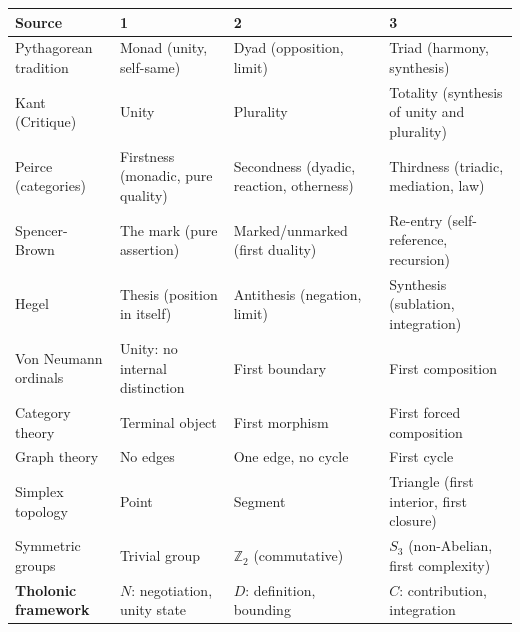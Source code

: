 \documentclass[
  11pt,
  letterpaper,
]{article}
\begin{document}
\begin{longtable}[]{@{}
  >{\raggedright\arraybackslash}p{}
  >{\raggedright\arraybackslash}p{}
  >{\raggedright\arraybackslash}p{}
  >{\raggedright\arraybackslash}p{}@{}}
\toprule\noalign{}
\begin{minipage}[b]{\linewidth}\raggedright
Source
\end{minipage} & \begin{minipage}[b]{\linewidth}\raggedright
1
\end{minipage} & \begin{minipage}[b]{\linewidth}\raggedright
2
\end{minipage} & \begin{minipage}[b]{\linewidth}\raggedright
3
\end{minipage} \\
\midrule\noalign{}
\endhead
\bottomrule\noalign{}
\endlastfoot
Pythagorean tradition & Monad (unity, self-same) & Dyad (opposition,
limit) & Triad (harmony, synthesis) \\
Kant (Critique) & Unity & Plurality & Totality (synthesis of unity and
plurality) \\
Peirce (categories) & Firstness (monadic, pure quality) & Secondness
(dyadic, reaction, otherness) & Thirdness (triadic, mediation, law) \\
Spencer-Brown & The mark (pure assertion) & Marked/unmarked (first
duality) & Re-entry (self-reference, recursion) \\
Hegel & Thesis (position in itself) & Antithesis (negation, limit) &
Synthesis (sublation, integration) \\
Von Neumann ordinals & Unity: no internal distinction & First boundary &
First composition \\
Category theory & Terminal object & First morphism & First forced
composition \\
Graph theory & No edges & One edge, no cycle & First cycle \\
Simplex topology & Point & Segment & Triangle (first interior, first
closure) \\
Symmetric groups & Trivial group & \(\mathbb{Z}_2\) (commutative) &
\(S_3\) (non-Abelian, first complexity) \\
\textbf{Tholonic framework} & \(N\): negotiation, unity state & \(D\):
definition, bounding & \(C\): contribution, integration \\
\end{longtable}
\end{document}
